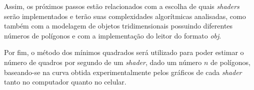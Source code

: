 Assim, os próximos passos estão relacionados com a escolha de quais \textit{shaders} serão implementados e terão suas complexidades algorítmicas analisadas, como também com a modelagem de objetos tridimensionais possuindo diferentes números de polígonos e com a implementação do leitor do formato \textit{obj}. 

Por fim, o método dos mínimos quadrados será utilizado para poder estimar o número de quadros por segundo de um \textit{shader}, dado um número $n$ de polígonos, baseando-se na curva obtida experimentalmente pelos gráficos de cada \textit{shader} tanto no computador quanto no celular. 



